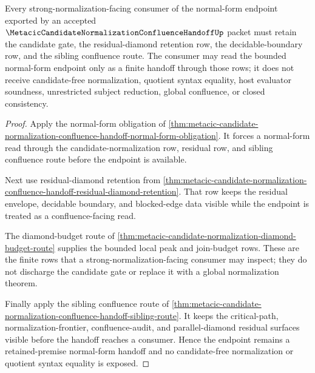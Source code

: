 \begin{theorem}
\label{thm:metacic-candidate-normalization-confluence-retained-premise-normal-form}
Every strong-normalization-facing consumer of the normal-form endpoint exported
by an accepted $\MetacicCandidateNormalizationConfluenceHandoffUp$ packet must
retain the candidate gate, the residual-diamond retention row, the
decidable-boundary row, and the sibling confluence route. The consumer may read
the bounded normal-form endpoint only as a finite handoff through those rows; it
does not receive candidate-free normalization, quotient syntax equality, host
evaluator soundness, unrestricted subject reduction, global confluence, or
closed consistency.
\end{theorem}
\begin{proof}
Apply the normal-form obligation of
\autoref{thm:metacic-candidate-normalization-confluence-handoff-normal-form-obligation}.
It forces a normal-form read through the candidate-normalization row, residual
row, and sibling confluence route before the endpoint is available.

Next use residual-diamond retention from
\autoref{thm:metacic-candidate-normalization-confluence-handoff-residual-diamond-retention}.
That row keeps the residual envelope, decidable boundary, and blocked-edge data
visible while the endpoint is treated as a confluence-facing read.

The diamond-budget route of
\autoref{thm:metacic-candidate-normalization-diamond-budget-route} supplies the
bounded local peak and join-budget rows. These are the finite rows that a
strong-normalization-facing consumer may inspect; they do not discharge the
candidate gate or replace it with a global normalization theorem.

Finally apply the sibling confluence route of
\autoref{thm:metacic-candidate-normalization-confluence-handoff-sibling-route}.
It keeps the critical-path, normalization-frontier, confluence-audit, and
parallel-diamond residual surfaces visible before the handoff reaches a
consumer. Hence the endpoint remains a retained-premise normal-form handoff and
no candidate-free normalization or quotient syntax equality is exposed.
\end{proof}

